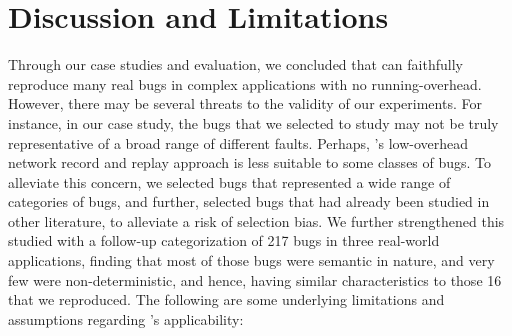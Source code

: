 
\section{Discussion and Limitations}
\label{sec:parikshanThreats}

Through our case studies and evaluation, we concluded that \parikshan can faithfully reproduce many real bugs in complex applications with no running-overhead.
However, there may be several threats to the validity of our experiments.
For instance, in our case study, the bugs that we selected to study may not be truly representative of a broad range of different faults.
Perhaps, \parikshan's low-overhead network record and replay approach is less suitable to some classes of bugs.
To alleviate this concern, we selected bugs that represented a wide range of categories of bugs, and further, selected bugs that had already been studied in other literature, to alleviate a risk of selection bias.
We further strengthened this studied with a follow-up categorization of 217 bugs in three real-world applications, finding that most of those bugs were semantic in nature, and very few were non-deterministic, and hence, having similar characteristics to those 16 that we reproduced. The following are some underlying limitations and assumptions regarding \parikshan's applicability:




